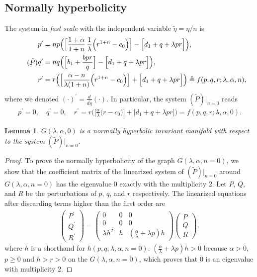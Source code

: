 \documentclass[a4paper,11pt]{article}
\newtheorem{lemma}{Lemma}[section]
\begin{document}
\subsection*{Normally hyperbolicity}
The system in {\it fast scale} with the independent variable $\tilde{\eta} = \eta/n$ is
\begin{equation}\label{eq:pqr_fast} \tag*{($\tilde{P}$)}
\begin{aligned}
 p^\prime &=np\Big( \Big[\frac{1+\alpha}{1+n}\,\frac{1}{\lambda }\Big(r^{1+n}-c_0\Big)\Big] -\Big[d_1 + q + \lambda pr\Big]\Big), \\
 q^\prime &=nq\Big(\Big[b_1 +\frac{bpr}{q}\Big] -\Big[d_1 + q + \lambda pr\Big]\Big), \\
 r^\prime &=r\Big( \Big[\frac{\alpha-n}{\lambda(1+n)}\Big(r^{1+n}-c_0\Big)\Big]+\Big[d_1 + q + \lambda pr\Big]\Big)\triangleq f(p,q,r;\lambda,\alpha,n),
\end{aligned}
\end{equation}
where we denoted $\displaystyle(\cdot)^\prime = \frac{d}{d\tilde{\eta}}(\cdot)$. In particular, the system $(\tilde{P})|_{n=0}$ reads
\begin{align}
 p^\prime =0, \quad q^\prime =0, \quad r^\prime=r\Big( \Big[\frac{\alpha}{\lambda}\Big(r-c_0\Big)\Big]+\Big[d_1 + q + \lambda pr\Big]\Big) = f(p,q,r;\lambda,\alpha,0). \label{eq:fastn0}
\end{align}

\begin{lemma} \label{lem:normal_hyper}
 $G(\lambda,\alpha,0)$ is a normally hyperbolic invariant manifold with respect to the system $(\tilde{P})|_{n=0}$.
\end{lemma}
\begin{proof}
To prove the normally hyperbolicity of the graph $G(\lambda,\alpha,n=0)$, we show that the coefficient matrix of the linearized system of $(\tilde{P})|_{n=0}$ around $G(\lambda,\alpha,n=0)$ has the eigenvalue $0$ exactly with the multiplicity $2$. Let $P$, $Q$, and $R$ be the perturbations of $p$, $q$, and $r$ respectively. The linearized equations after discarding terms higher than the first order are
\begin{align*}
 \begin{pmatrix} {P}^\prime\\ {Q}^\prime \\ {R}^\prime \end{pmatrix} =
 \begin{pmatrix} 0 & 0& 0\\ 0 & 0 & 0\\ \lambda h^2 & h & ( \frac{\alpha}{ \lambda} + \lambda p )h \end{pmatrix} \begin{pmatrix} {P}\\ {Q} \\ {R} \end{pmatrix},
\end{align*}
where $h$ is a shorthand for $h(p,q;\lambda,\alpha,n=0)$. $( \frac{\alpha}{ \lambda} + \lambda p )h > 0$ because $\alpha>0$, $p\ge0$ and $h > \underbar{r}>0$ on the $G(\lambda,\alpha,n=0)$, which proves that $0$ is an eigenvalue with multiplicity $2$.
\end{proof}
\end{document}
